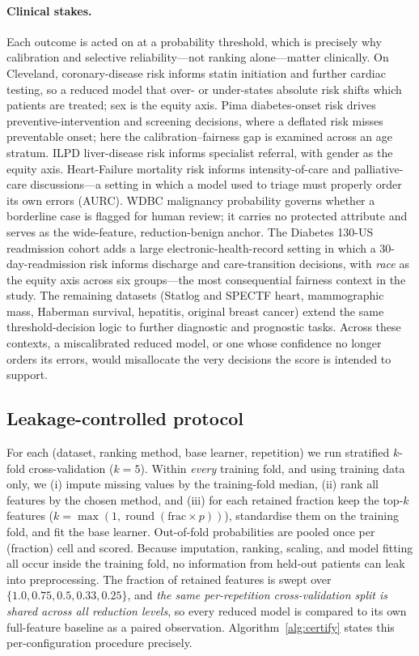 \documentclass[fleqn,10pt]{wlscirep}
\begin{document}
\paragraph{Clinical stakes.} Each outcome is acted on at a probability threshold, which is precisely
why calibration and selective reliability---not ranking alone---matter clinically. On Cleveland,
coronary-disease risk informs statin initiation and further cardiac testing, so a reduced model that
over- or under-states absolute risk shifts which patients are treated; sex is the equity axis. Pima
diabetes-onset risk drives preventive-intervention and screening decisions, where a deflated risk
misses preventable onset; here the calibration--fairness gap is examined across an age stratum. ILPD
liver-disease risk informs specialist referral, with gender as the equity axis. Heart-Failure
mortality risk informs intensity-of-care and palliative-care discussions---a setting in which a model
used to triage must properly order its own errors (AURC). WDBC malignancy probability governs whether a
borderline case is flagged for human review; it carries no protected attribute and serves as the
wide-feature, reduction-benign anchor. The Diabetes 130-US readmission cohort adds a large
electronic-health-record setting in which a 30-day-readmission risk informs discharge and
care-transition decisions, with \emph{race} as the equity axis across six groups---the most
consequential fairness context in the study. The remaining datasets (Statlog and SPECTF heart,
mammographic mass, Haberman survival, hepatitis, original breast cancer) extend the same
threshold-decision logic to further diagnostic and prognostic tasks. Across these contexts, a
miscalibrated reduced model, or one whose confidence no longer orders its errors, would misallocate
the very decisions the score is intended to support.

\subsection{Leakage-controlled protocol}
For each (dataset, ranking method, base learner, repetition) we run stratified $k$-fold
cross-validation ($k=5$). Within \emph{every} training fold, and using training data only, we
(i) impute missing values by the training-fold median, (ii) rank all features by the chosen
method, and (iii) for each retained fraction keep the top-$k$ features
($k=\max(1,\operatorname{round}(\mathrm{frac}\times p))$), standardise them on the training fold,
and fit the base learner. Out-of-fold probabilities are pooled once per (fraction) cell and scored. Because
imputation, ranking, scaling, and model fitting all occur inside the training fold, no
information from held-out patients can leak into preprocessing. The fraction of retained
features is swept over $\{1.0, 0.75, 0.5, 0.33, 0.25\}$, and \emph{the same per-repetition
cross-validation split is shared across all reduction levels}, so every reduced model is
compared to its own full-feature baseline as a paired observation. Algorithm~\ref{alg:certify} states
this per-configuration procedure precisely.
\end{document}
